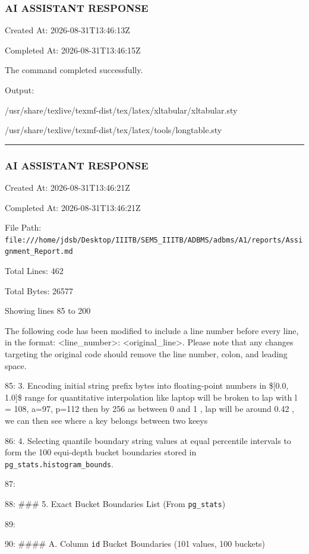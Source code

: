 \documentclass[11pt,a4paper]{article}
\begin{document}
{{{\subsubsection{AI ASSISTANT RESPONSE}

Created At: 2026-08-31T13:46:13Z

Completed At: 2026-08-31T13:46:15Z


The command completed successfully.

Output:

/usr/share/texlive/texmf-dist/tex/latex/xltabular/xltabular.sty

/usr/share/texlive/texmf-dist/tex/latex/tools/longtable.sty


\hrule

\subsubsection{AI ASSISTANT RESPONSE}

Created At: 2026-08-31T13:46:21Z

Completed At: 2026-08-31T13:46:21Z

File Path: \texttt{file:///home/jdsb/Desktop/IIITB/SEM5\_IIITB/ADBMS/adbms/A1/reports/Assignment\_Report.md}

Total Lines: 462

Total Bytes: 26577

Showing lines 85 to 200

The following code has been modified to include a line number before every line, in the format: <line\_number>: <original\_line>. Please note that any changes targeting the original code should remove the line number, colon, and leading space.

85: 3. Encoding initial string prefix bytes into floating-point numbers in \$[0.0, 1.0]\$ range for quantitative interpolation like laptop will be broken to lap with l = 108, a=97, p=112 then by 256 as between 0 and 1 , lap will be around 0.42 , we can then see where a key belongs between two keeys

86: 4. Selecting quantile boundary string values at equal percentile intervals to form the 100 equi-depth bucket boundaries stored in \texttt{pg\_stats.histogram\_bounds}.

87:

88: \#\#\# 5. Exact Bucket Boundaries List (From \texttt{pg\_stats})

89:

90: \#\#\#\# A. Column \texttt{id} Bucket Boundaries (101 values, 100 buckets)

}}}
\end{document}
